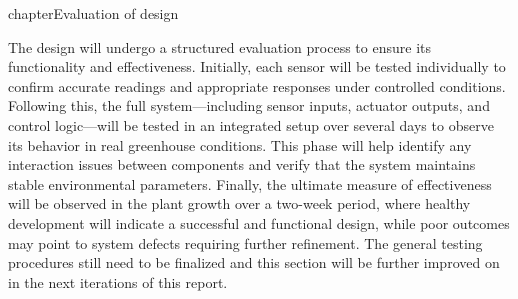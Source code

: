 chapter{Evaluation of design}

The design will undergo a structured evaluation process to ensure its functionality and effectiveness. Initially, each sensor will be tested individually to confirm accurate readings and appropriate responses under controlled conditions. Following this, the full system—including sensor inputs, actuator outputs, and control logic—will be tested in an integrated setup over several days to observe its behavior in real greenhouse conditions. This phase will help identify any interaction issues between components and verify that the system maintains stable environmental parameters. Finally, the ultimate measure of effectiveness will be observed in the plant growth over a two-week period, where healthy development will indicate a successful and functional design, while poor outcomes may point to system defects requiring further refinement. The general testing procedures still need to be finalized and this section will be further improved on in the next iterations of this report. 